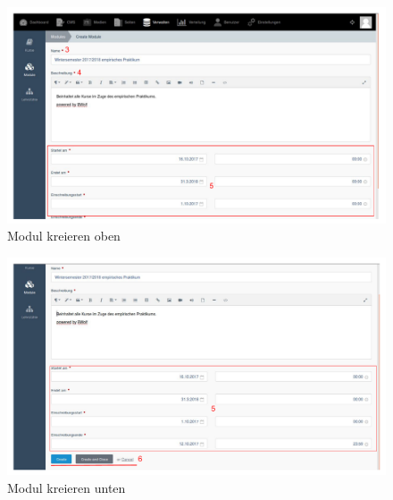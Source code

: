 	\begin{figure}
		\centering
	    \includegraphics[scale=0.5]{backend/img/module_2.pdf}
	    \caption{Modul kreieren oben}
	    \label{fig:create_module}
	\end{figure}

	\begin{figure}
		\centering
		\includegraphics[scale=0.5]{backend/img/module_3.pdf}
		\caption{Modul kreieren unten}
		\label{fig:create_module2}
	\end{figure}
    
